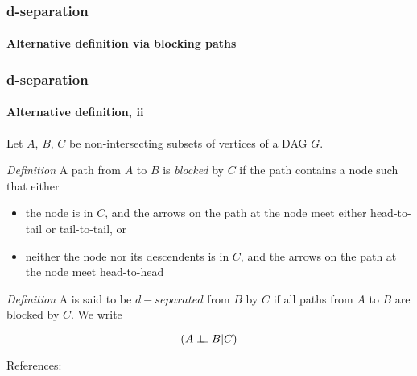 \begin{frame}
    \frametitle{d-separation}
    \framesubtitle{Alternative definition via blocking paths}
    
 
\end{frame}

\begin{frame}
    \frametitle{d-separation}
    \framesubtitle{Alternative definition, ii}

    Let $A$, $B$, $C$ be non-intersecting subsets of vertices of a DAG $G$. \newline

    \emph{Definition} A path from $A$ to $B$ is \emph{blocked} by $C$ if the path contains a node such that either

    \begin{itemize}
    \item the node is in $C$, and the arrows on the path at the node meet either head-to-tail or tail-to-tail, or
    \item neither the node nor its descendents is in $C$, and the arrows on the path at the node meet head-to-head \newline
    \end{itemize}

    \emph{Definition} A is said to be $d-separated$ from $B$ by $C$ if all paths from $A$ to $B$ are blocked by $C$. We write

    \begin{equation*}
        (A \perp\!\!\!\perp B | C)
    \end{equation*}

    References: \cite{tum-graphical}

    
\end{frame}


